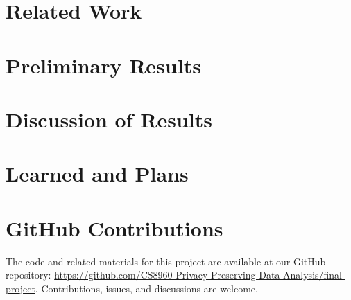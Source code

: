 \documentclass{article}
\begin{document}
    \section{Related Work}\label{sec:related-work}

    \break
    \section{Preliminary Results}\label{sec:prelim-results}

 
    \break
    \section{Discussion of Results}\label{sec:results-discussion}

    \break
    \section{Learned and Plans}\label{sec:learned-and-plans}
    

    
    


    \section*{GitHub Contributions}
    The code and related materials for this project are available at our GitHub repository:
    \url{https://github.com/CS8960-Privacy-Preserving-Data-Analysis/final-project}.
    Contributions, issues, and discussions are welcome.
\end{document}
